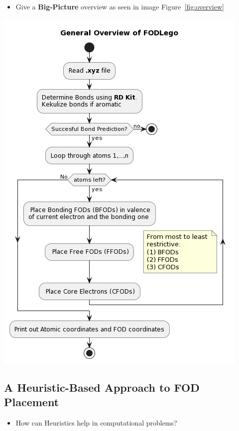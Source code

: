 \documentclass[12pt,a4paper,]{report}
\let\origfigure=\figure
\let\endorigfigure=\endfigure
\renewenvironment{figure}[1][]{%
\origfigure[H]
}{%
\endorigfigure
}
\providecommand{\tightlist}{%
  \setlength{\itemsep}{0pt}\setlength{\parskip}{0pt}}
\begin{document}
\begin{itemize}
\tightlist
\item
  Give a \textbf{Big-Picture} overview as seen in image
  Figure~\ref{fig:overview}
\end{itemize}

\begin{figure}
\hypertarget{fig:overview}{%
\centering
\includegraphics{source/figures/overview.png}
\caption{overview}\label{fig:overview}
}
\end{figure}

\subsection{A Heuristic-Based Approach to FOD
Placement}\label{a-heuristic-based-approach-to-fod-placement}

\begin{itemize}
\tightlist
\item
  How can Heuristics help in computational problems?
\end{itemize}
\end{document}
